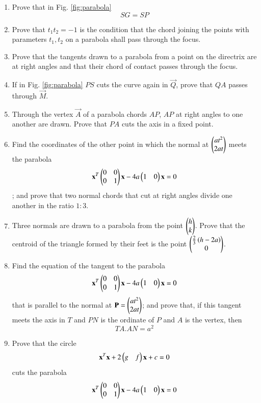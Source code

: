 \begin{enumerate}[label=\arabic*.,ref=\thesubsection.\theenumi]
\item Prove that in  Fig. \ref{fig:parabola}
\begin{equation}
SG=SP
\end{equation}
\item Prove that $t_1t_2=-1$ is the condition that the chord joining the points with parameters $t_1, t_2$ on
a parabola shall pass through the focus.
\item Prove that the tangents drawn to a parabola from a point on the
directrix are at right angles and that their chord of contact passes
through the focus.
\item If in Fig. \ref{fig:parabola} $PS$ cuts the curve again in $\vec{Q}$, prove that $QA$ passes
through $\vec{M}$.
\item Through the vertex $\vec{A}$ of a parabola chords $AP$, $AP$ at right angles
to one another are drawn.  Prove that $PA$ cuts the axis in a fixed point.
\item Find the coordinates of the other point in which the normal at $\begin{pmatrix}at^2\\2at\end{pmatrix}$
meets the parabola 
\begin{align}
\mathbf{x}^T\begin{pmatrix}0 & 0\\0 & 1\end{pmatrix}\mathbf{x}-4a\begin{pmatrix}1 & 0 \end{pmatrix}\mathbf{x}= 0 
\end{align}
;
 and prove that two normal chords that cut at right angles
divide one another in the ratio $1:3$.
\item Three normals are drawn to a parabola from the point $\begin{pmatrix}h\\k\end{pmatrix}$.  Prove that
the centroid of the triangle formed by their feet is the point $\begin{pmatrix}\frac{2}{3}\left(h-2a\right)\\0\end{pmatrix}$.
\item Find the equation of the tangent to the parabola 
\begin{align}
\mathbf{x}^T\begin{pmatrix}0 & 0\\0 & 1\end{pmatrix}\mathbf{x}-4a\begin{pmatrix}1 & 0 \end{pmatrix}\mathbf{x}= 0 
\end{align}
%
 that is parallel
to the normal at $\mathbf{P}= \begin{pmatrix}at^2\\2at\end{pmatrix}$; and prove that, if this tangent meets the axis in $T$
and $PN$ is the ordinate of $P$ and $A$ is the vertex, then
\begin{equation}
TA.AN=a^2
\end{equation}
\item Prove that the circle 
\begin{align}
\mathbf{x}^T\mathbf{x}+2\begin{pmatrix}g & f \end{pmatrix}\mathbf{x}+c= 0 
\end{align}
%
 cuts the parabola 
\begin{align}
\mathbf{x}^T\begin{pmatrix}0 & 0\\0 & 1\end{pmatrix}\mathbf{x}-4a\begin{pmatrix}1 & 0 \end{pmatrix}\mathbf{x}= 0 
\end{align}


\end{enumerate}
